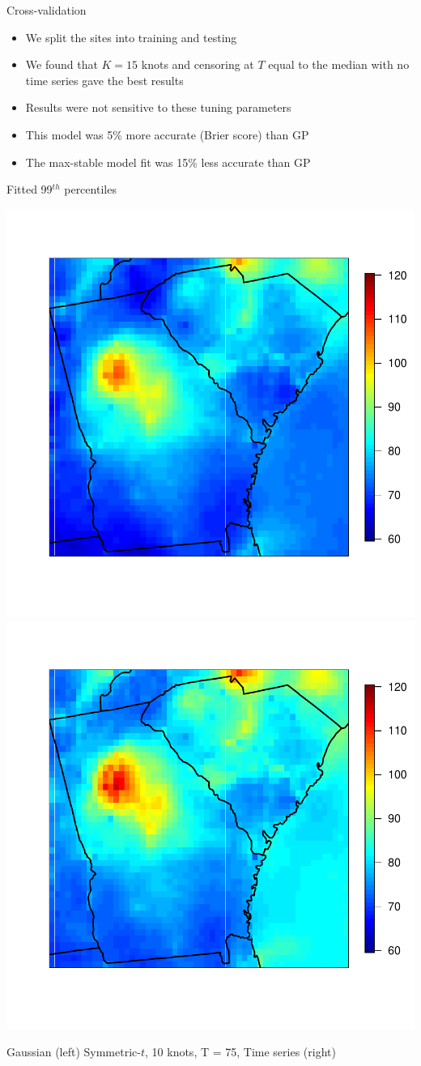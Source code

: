 \documentclass{beamer}
\begin{document}
 \begin{frame}{Cross-validation}
 	\begin{itemize}\setlength\itemsep{1em}
 	\item We split the sites into training and testing
 	\item We found that $K=15$ knots and censoring at $T$ equal to the median with no time series gave the best results
 	\item Results were not sensitive to these tuning parameters
 	\item This model was 5\% more accurate (Brier score) than GP
 	\item The max-stable model fit was 15\% less accurate than GP
 	\end{itemize}
 \end{frame}

 \begin{frame}{Fitted 99$^{th}$ percentiles}
 	\begin{center}
 		\includegraphics[width=0.45\linewidth]{q99gaus}
 		\includegraphics[width=0.45\linewidth]{q99skewtTS}

 		Gaussian (left) Symmetric-$t$, 10 knots, T = 75, Time series (right)
 	\end{center}
 \end{frame}
\end{document}
